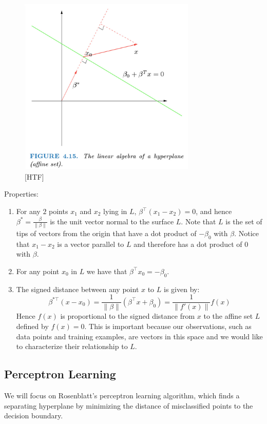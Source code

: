\documentclass[a4paper]{article}
\begin{document}
\begin{figure}
\centering
\includegraphics[width=0.75\textwidth]{fig415.png}
\caption{\label{fig:415}[HTF]}
\end{figure}

Properties:
\begin{enumerate}
\item For any $2$ points $x_1$ and $x_2$ lying in $L$, $\beta^\top (x_1-x_2)=0$, and hence $\beta^*=\frac{\beta}{\|\beta\|}$ is the unit vector normal to the surface $L$. Note that $L$ is the set of tips of vectors from the origin that have a dot product of $-\beta_0$ with $\beta$. Notice that $x_1-x_2$ is a vector parallel to $L$ and therefore has a dot product of $0$ with $\beta$.
\item For any point $x_0$ in $L$ we have that $\beta^\top x_0=-\beta_0$.
\item The signed distance between any point $x$ to $L$ is given by:
$$\beta^{*\top}(x-x_0)=\frac{1}{\|\beta\|}(\beta^\top x+\beta_0)=\frac{1}{\|f'(x)\|}f(x)$$
Hence $f(x)$ is proportional to the signed distance from $x$ to the affine set $L$ defined by $f(x)=0$. This is important because our observations, such as data points and training examples, are vectors in this space and we would like to characterize their relationship to $L$.
\end{enumerate}

\subsection{Perceptron Learning}
We will focus on Rosenblatt's perceptron learning algorithm, which finds a separating hyperplane by minimizing the distance of misclassified points to the decision boundary.
\end{document}
